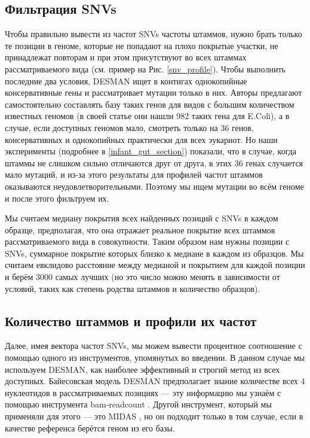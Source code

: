 \documentclass{spbau-diploma}
\begin{document}
\subsection{Фильтрация SNVs}

Чтобы правильно вывести из частот SNVs частоты штаммов, нужно брать только те позиции в геноме, которые не попадают на плохо покрытые участки, не принадлежат повторам и при этом присутствуют во всех штаммах рассматриваемого вида (см. пример на Рис. \ref{snv_profile}). Чтобы выполнить последние два условия, DESMAN ищет в контигах однокопийные консервативные гены и рассматривает мутации только в них. Авторы предлагают самостоятельно составлять базу таких генов для видов с большим количеством известных геномов (в своей статье они нашли 982 таких гена для E.Coli), а в случае, если доступных геномов мало, смотреть только на 36 генов, консервативных и однокопийных практически для всех эукариот. Но наши эксперименты (подробнее в \ref{infant_gut_section}) показали, что в случае, когда штаммы не слишком сильно отличаются друг от друга, в этих 36 генах случается мало мутаций, и из-за этого результаты для профилей частот штаммов оказываются неудовлетворительными. Поэтому мы ищем мутации во всём геноме и после этого фильтруем их. 

Мы считаем медиану покрытия всех найденных позиций с SNVs в каждом образце, предполагая, что она отражает реальное покрытие всех штаммов рассматриваемого вида в совокупности. Таким образом нам нужны позиции с SNVs, суммарное покрытие которых близко к медиане в каждом из образцов. Мы считаем евклидово расстояние между медианой и покрытием для каждой позиции и берём 3000 самых лучших (но это число можно менять в зависимости от условий, таких как степень родства штаммов и количество образцов).

\subsection{Количество штаммов и профили их частот}

Далее, имея вектора частот SNVs, мы можем вывести процентное соотношение с помощью одного из инструментов, упомянутых во введении. В данном случае мы используем DESMAN, как наиболее эффективный и строгий метод из всех доступных. Байесовская модель DESMAN предполагает знание количестве всех 4 нуклеотидов в рассматриваемых позициях --- эту информацию мы узнаём с помощью инструмента bam-readcount \cite{bam_readcount}. Другой инструмент, который мы применяли для этого --- это MIDAS \cite{midas}, но он подходит только в том случае, если в качестве референса берётся геном из его базы.
\end{document}
